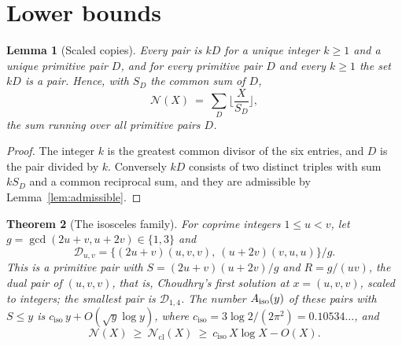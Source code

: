 \documentclass[11pt]{amsart}
\newtheorem{theorem}{Theorem}[section]
\newtheorem{lemma}[theorem]{Lemma}
\theoremstyle{definition}
\theoremstyle{remark}
\newcommand{\N}{\mathcal{N}}
\newcommand{\Ncl}{\mathcal{N}_{\mathrm{cl}}}
\newcommand{\ciso}{c_{\mathrm{iso}}}
\begin{document}
\section{Lower bounds}\label{sec:lower}

\begin{lemma}[Scaled copies]\label{lem:copies}
Every pair is $kD$ for a unique integer $k\ge1$ and a unique primitive pair $D$, and for every primitive pair $D$ and every $k\ge1$ the set $kD$ is a pair. Hence, with $S_D$ the common sum of $D$,
\begin{equation}\label{eq:copies}
  \N(X)\ =\ \sum_D\Big\lfloor\frac X{S_D}\Big\rfloor,
\end{equation}
the sum running over all primitive pairs $D$.
\end{lemma}

\begin{proof}
The integer $k$ is the greatest common divisor of the six entries, and $D$ is the pair divided by $k$. Conversely $kD$ consists of two distinct triples with sum $kS_D$ and a common reciprocal sum, and they are admissible by Lemma~\ref{lem:admissible}.
\end{proof}

\begin{theorem}[The isosceles family]\label{thm:iso}
For coprime integers $1\le u<v$, let $g=\gcd(2u+v,u+2v)\in\{1,3\}$ and
\[
  \mathcal D_{u,v}=\big\{(2u+v)(u,v,v),\ (u+2v)(v,u,u)\big\}/g .
\]
This is a primitive pair with $S=(2u+v)(u+2v)/g$ and $R=g/(uv)$, the dual pair of $(u,v,v)$, that is, Choudhry's first solution \cite[\S4.1]{choudhry2011} at $x=(u,v,v)$, scaled to integers; the smallest pair is $\mathcal D_{1,4}$. The number $A_{\rm iso}(y)$ of these pairs with $S\le y$ is $\ciso\,y+O(\sqrt y\log y)$, where $\ciso=3\log2/(2\pi^2)=0.10534\ldots$, and
\[
  \N(X)\ \ge\ \Ncl(X)\ \ge\ \ciso\,X\log X-O(X).
\]
\end{theorem}
\end{document}
